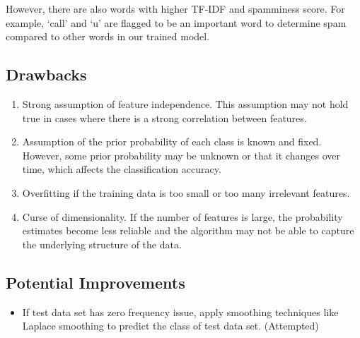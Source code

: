 However, there are also words with higher TF-IDF and spamminess score. 
For example, `call' and `u' are flagged to be an important word to determine spam compared to other words in our trained model.


\subsection{Drawbacks \cite{bathula2023limitations}}

\begin{enumerate}
    \item Strong assumption of feature independence. This assumption may not hold true in cases where there is a strong correlation between features.
    \item Assumption of the prior probability of each class is known and fixed. However, some prior probability may be unknown or that it changes over time, which affects the classification accuracy.
    \item Overfitting if the training data is too small or too many irrelevant features.
    \item Curse of dimensionality. If the number of features is large, the probability estimates become less reliable and the algorithm may not be able to capture the underlying structure of the data.
\end{enumerate}


\subsection{Potential Improvements}

\begin{itemize}
    \item If test data set has zero frequency issue, apply smoothing techniques like Laplace smoothing to predict the class of test data set. (Attempted)
\end{itemize}
